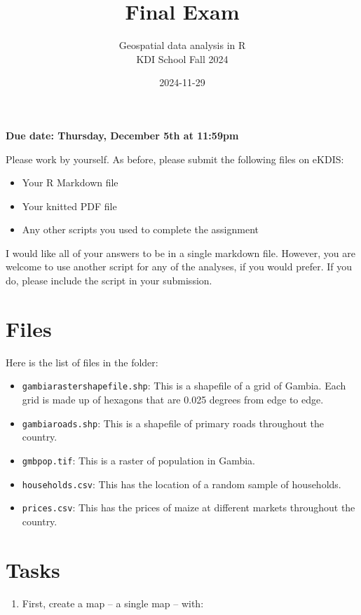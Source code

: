 \documentclass[
]{article}
\title{Final Exam}
\subtitle{Geospatial data analysis in R\\
KDI School Fall 2024}
\author{}
\date{\vspace{-2.5em}2024-11-29}
\providecommand{\tightlist}{%
  \setlength{\itemsep}{0pt}\setlength{\parskip}{0pt}}
\begin{document}
\maketitle

\textbf{Due date: Thursday, December 5th at 11:59pm}

Please work by yourself. As before, please submit the following files on eKDIS:

\begin{itemize}
\tightlist
\item
  Your R Markdown file
\item
  Your knitted PDF file
\item
  Any other scripts you used to complete the assignment
\end{itemize}

I would like all of your answers to be in a single markdown file. However, you are welcome to use another script for any of the analyses, if you would prefer. If you do, please include the script in your submission.

\section{Files}\label{files}

Here is the list of files in the folder:

\begin{itemize}
\tightlist
\item
  \texttt{gambiarastershapefile.shp}: This is a shapefile of a grid of Gambia. Each grid is made up of hexagons that are 0.025 degrees from edge to edge.
\item
  \texttt{gambiaroads.shp}: This is a shapefile of primary roads throughout the country.
\item
  \texttt{gmbpop.tif}: This is a raster of population in Gambia.
\item
  \texttt{households.csv}: This has the location of a random sample of households.
\item
  \texttt{prices.csv}: This has the prices of maize at different markets throughout the country.
\end{itemize}

\section{Tasks}\label{tasks}

\begin{enumerate}
\def\labelenumi{\arabic{enumi}.}
\tightlist
\item
  First, create a map -- a single map -- with:
\end{enumerate}
\end{document}
